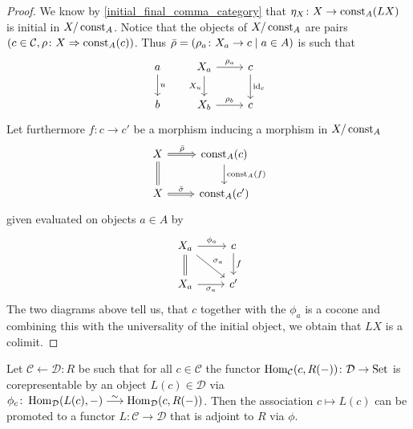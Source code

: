 \begin{proof}
    We know by \cref{initial_final_comma_category} that $\eta_X \colon X \to \operatorname{const}_A(LX)$ is initial in $X / \operatorname{const}_A$.
    Notice that the objects of $X/\operatorname{const}_A$ are pairs
    $(c \in \mathcal{C}, \rho \colon X \Rightarrow \operatorname{const}_A(c))$.
    Thus $\Bar{\rho} = ( \rho_a \colon X_a \to c \mid a \in A )$ is such that 
    \[
    \begin{tikzcd}
        a
        \arrow[d,"u"]
        &
        X_a 
        \arrow[r, "\rho_a"]
        \arrow[d, "X_u"']
        &
        c
        \arrow[d, "\id_c"]
        \\
        b
        &
        X_b
        \arrow[r, "\rho_b"]
        &
        c
    \end{tikzcd}
    \]
    Let furthermore $f\colon c \to c'$ be a morphism inducing a morphism in $X/\operatorname{const}_A$
    \[
    \begin{tikzcd}
        X 
        \arrow[r, Rightarrow, "\Bar{\rho}"]
        \arrow[d, equal]
        &
        \const_A(c)
        \arrow[d, "\const_A(f)"]
        \\
        X 
        \arrow[r, Rightarrow, "\Bar{\sigma}"]
        &
        \const_A(c')
    \end{tikzcd}
    \]
    given evaluated on objects $a \in A$ by 
    \[
    \begin{tikzcd}
        X_a
        \arrow[r, "\phi_a"]
        \arrow[rd, " \sigma_a"]
        \arrow[d, equal]
        &
        c
        \arrow[d, "f"] 
        \\
        X_a
        \arrow[r,"\sigma_a"']
        &
        c'
    \end{tikzcd}
    \]
    The two diagrams above tell us, that $c$ together with the $\phi_a$ is a cocone and combining this with the universality of the initial object, we obtain that $LX$ is a colimit.
\end{proof}

\begin{prop}
    Let $\mathcal{C} \xleftarrow{}\mathcal{D}:R$ be such that for all $c \in \mathcal{C}$ the functor $\operatorname{Hom}_{\mathcal{C}}(c,R(-))\colon \mathcal{D} \to \operatorname{Set}$ is corepresentable by an object $L(c) \in \mathcal{D}$ via $\phi_c \colon \Hom_{\mathcal{D}}(L(c),-) \isomorphism \Hom_{\mathcal{D}}(c,R(-))$.
    Then the association $c \mapsto L(c)$ can be promoted to a functor $L \colon \mathcal{C} \to \mathcal{D}$ that is adjoint to $R$ via $\phi$.
\end{prop}

